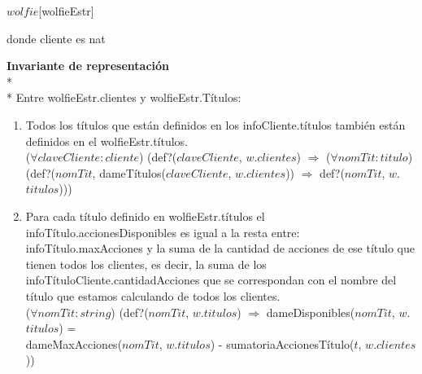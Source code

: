 \begin{Representacion}
\begin{Estructura}{$wolfie$}[wolfieEstr]
    \par donde cliente es nat
        
  \end{Estructura}
  \textbf{Invariante de representación}\\* \\* Entre wolfieEstr.clientes y wolfieEstr.Títulos:
 \begin{enumerate}
 	\item Todos los títulos que están definidos en los infoCliente.títulos también están definidos en el wolfieEstr.títulos.\\
    ($\forall claveCliente:cliente$) (def?($claveCliente$, $w$.$clientes$) $\Rightarrow$ ($\forall nomTit:titulo$)\\ (def?($nomTit$, dameTítulos($claveCliente$, $w$.$clientes$)) $\Rightarrow$ def?($nomTit$, $w$.$titulos$)))
    \item Para cada título definido en wolfieEstr.títulos el infoTítulo.accionesDisponibles es igual a la resta entre: infoTítulo.maxAcciones y la suma de la cantidad de acciones de ese título que tienen todos los clientes, es decir, la suma de los infoTítuloCliente.cantidadAcciones que se correspondan con el nombre del título que estamos calculando de todos los clientes.\\
    ($\forall nomTit:string$) (def?($nomTit$, $w$.$titulos$) $\Rightarrow$ dameDisponibles($nomTit$, $w$.$titulos$) = \\dameMaxAcciones($nomTit$, $w$.$titulos$) - sumatoriaAccionesTítulo($t$, $w$.$clientes$))
    

\end{enumerate}
\end{Representacion}
